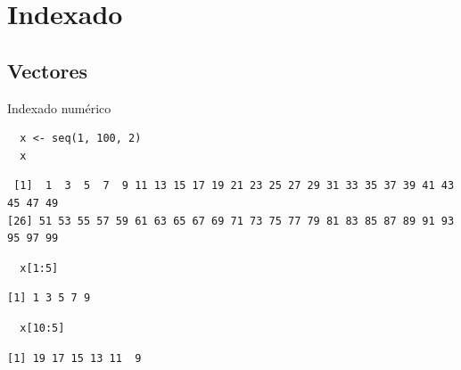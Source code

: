 \documentclass[xcolor={usenames,svgnames,dvipsnames}]{beamer}
\begin{document}
\section{Indexado}
\label{sec-3}
\subsection{Vectores}
\label{sec-3-1}
\begin{frame}[fragile,label=sec-3-1-1]{Indexado numérico}
 \lstset{language=R,label= ,caption= ,numbers=none}
\begin{lstlisting}
  x <- seq(1, 100, 2)
  x
\end{lstlisting}

\begin{verbatim}
 [1]  1  3  5  7  9 11 13 15 17 19 21 23 25 27 29 31 33 35 37 39 41 43 45 47 49
[26] 51 53 55 57 59 61 63 65 67 69 71 73 75 77 79 81 83 85 87 89 91 93 95 97 99
\end{verbatim}

\lstset{language=R,label= ,caption= ,numbers=none}
\begin{lstlisting}
  x[1:5]
\end{lstlisting}

\begin{verbatim}
[1] 1 3 5 7 9
\end{verbatim}

\lstset{language=R,label= ,caption= ,numbers=none}
\begin{lstlisting}
  x[10:5]
\end{lstlisting}

\begin{verbatim}
[1] 19 17 15 13 11  9
\end{verbatim}
\end{frame}
\end{document}
